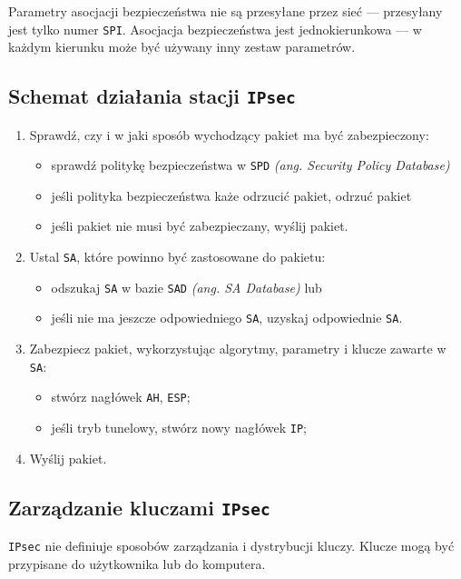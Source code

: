 \documentclass{article}
\begin{document}
Parametry asocjacji bezpieczeństwa nie są przesyłane przez sieć --- przesyłany jest tylko numer {\tt SPI}.
Asocjacja bezpieczeństwa jest jednokierunkowa --- w każdym kierunku może być używany inny zestaw parametrów.

\subsection{Schemat działania stacji {\tt IPsec}}

\begin{enumerate}
  \item Sprawdź, czy i w jaki sposób wychodzący pakiet ma być zabezpieczony:
  \begin{itemize}
    \item sprawdź politykę bezpieczeństwa w {\tt SPD} \emph{(ang. Security Policy Database)}
    \item jeśli polityka bezpieczeństwa każe odrzucić pakiet, odrzuć pakiet
    \item jeśli pakiet nie musi być zabezpieczany, wyślij pakiet.
  \end{itemize}
  \item Ustal {\tt SA}, które powinno być zastosowane do pakietu:
  \begin{itemize}
    \item odszukaj {\tt SA} w bazie {\tt SAD} \emph{(ang. SA Database)} lub
    \item jeśli nie ma jeszcze odpowiedniego {\tt SA}, uzyskaj odpowiednie {\tt SA}.
  \end{itemize}
  \item Zabezpiecz pakiet, wykorzystując algorytmy, parametry i klucze zawarte w {\tt SA}:
  \begin{itemize}
    \item stwórz nagłówek {\tt AH}, {\tt ESP};
    \item jeśli tryb tunelowy, stwórz nowy nagłówek {\tt IP};
  \end{itemize}
  \item Wyślij pakiet.
\end{enumerate}

\subsection{Zarządzanie kluczami {\tt IPsec}}

{\tt IPsec} nie definiuje sposobów zarządzania i dystrybucji kluczy.
Klucze mogą być przypisane do użytkownika lub do komputera.
\end{document}
